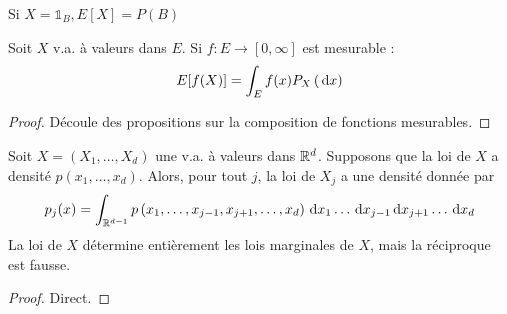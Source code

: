 \documentclass{cours}
\begin{document}
\begin{proposition}
    Si $X = \mathds{1}_{B}, E[X] = P(B)$
\end{proposition}

\begin{proposition}
    Soit $X$ v.a. à valeurs dans $E$. Si $f : E \rightarrow \left[0, \infty\right]$ est mesurable :
    \[
        E[f(X)] = \int_{E} f(x)P_{X}\left({\rm \, d} x\right)
    \]
\end{proposition}
\begin{proof}
    Découle des propositions sur la composition de fonctions mesurables.
\end{proof}

\begin{proposition}
    Soit $X = \left(X_{1}, \ldots, X_{d}\right)$ une v.a. à valeurs dans $\mathbb{R}^{d}$. Supposons que la loi de $X$ a densité $p\left(x_{1}, \ldots, x_{d}\right)$. Alors, pour tout $j$, la loi de $X_{j}$ a une densité donnée par
    \[
        p_{j}(x) = \int_{\mathbb{R}^{d - 1}} p\left(x_{1}, \ldots, x_{j - 1}, x_{j + 1}, \ldots, x_{d}\right){\rm \, d} x_{1} \ldots {\rm \, d} x_{j - 1} {\rm \, d} x_{j + 1}\ldots {\rm \, d} x_{d}
    \]
    La loi de $X$ détermine entièrement les lois marginales de $X$, mais la réciproque est fausse.
\end{proposition}
\begin{proof}
    Direct.
\end{proof}
\end{document}

